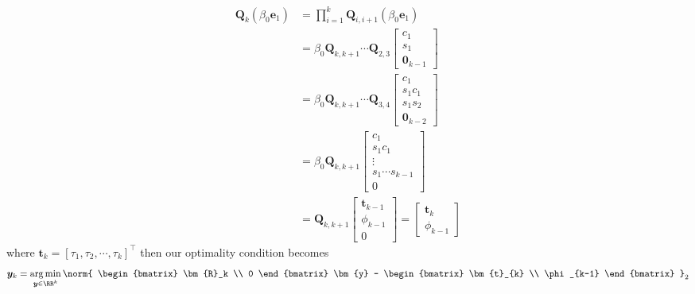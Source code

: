 \begin{align*}
    \bm{Q}_k \left( \beta_0 \bm{e}_1 \right) & = \prod_{i=1}^{k} \bm{Q}_{i,i+1} \left( \beta_0 \bm{e}_1 \right) \\
                                             & =
    \beta_0 \bm{Q}_{k,k+1} \cdots \bm{Q}_{2,3}
    \begin{bmatrix}
        c_1 \\ s_1 \\ \bm{0}_{k-1}
    \end{bmatrix}                                                                                  \\
                                             & =
    \beta_0 \bm{Q}_{k,k+1} \cdots \bm{Q}_{3,4}
    \begin{bmatrix}
        c_1 \\ s_1 c_1 \\ s_1 s_2 \\ \bm{0}_{k-2}
    \end{bmatrix}                                                                                  \\
                                             & =
    \beta_0 \bm{Q}_{k,k+1}
    \begin{bmatrix}
        c_1 \\ s_1 c_1 \\ \vdots \\ s_1 \cdots s_{k-1} \\ 0
    \end{bmatrix}                                                                                  \\
                                             & =
    \bm{Q}_{k,k+1}
    \begin{bmatrix}
        \bm{t}_{k-1} \\ \phi_{k-1} \\ 0
    \end{bmatrix}
    =
    \begin{bmatrix}
        \bm{t}_{k} \\ \phi_{k-1}
    \end{bmatrix}
\end{align*}
where $\bm{t}_k = \left[ \tau_1 , \tau_2 , \cdots , \tau_k \right]^{\intercal}$ then our optimality condition becomes
\begin{equation*}
    \bm{y}_k = \argmin_{\bm{y} \in \RR^k} \norm{
        \begin{bmatrix}
            \bm{R}_k \\ 0
        \end{bmatrix} \bm{y} -
        \begin{bmatrix}
            \bm{t}_{k} \\ \phi_{k-1}
        \end{bmatrix}
    }_2
\end{equation*}
